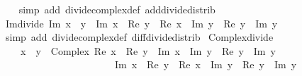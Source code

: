 \begin{isabellebody}
%
\isadelimproof
\ \ %
\endisadelimproof
%
\isatagproof
{}\isamarkupfalse%
\ {\isacharparenleft}{\kern0pt}simp\ add{\isacharcolon}{\kern0pt}\ divide{\isacharunderscore}{\kern0pt}complex{\isacharunderscore}{\kern0pt}def\ add{\isacharunderscore}{\kern0pt}divide{\isacharunderscore}{\kern0pt}distrib{\isacharparenright}{\kern0pt}%
\endisatagproof
{\isafoldproof}%
%
\isadelimproof
\isanewline
%
\endisadelimproof
\isanewline
{}\isamarkupfalse%
\ Im{\isacharunderscore}{\kern0pt}divide{\isacharcolon}{\kern0pt}\ {\isachardoublequoteopen}Im\ {\isacharparenleft}{\kern0pt}x\ {\isacharslash}{\kern0pt}\ y{\isacharparenright}{\kern0pt}\ {\isacharequal}{\kern0pt}\ {\isacharparenleft}{\kern0pt}Im\ x\ {\isacharasterisk}{\kern0pt}\ Re\ y\ {\isacharminus}{\kern0pt}\ Re\ x\ {\isacharasterisk}{\kern0pt}\ Im\ y{\isacharparenright}{\kern0pt}\ {\isacharslash}{\kern0pt}\ {\isacharparenleft}{\kern0pt}{\isacharparenleft}{\kern0pt}Re\ y{\isacharparenright}{\kern0pt}\ {\isacharplus}{\kern0pt}\ {\isacharparenleft}{\kern0pt}Im\ y{\isacharparenright}{\kern0pt}\isanewline
%
\isadelimproof
\ \ %
\endisadelimproof
%
\isatagproof
{}\isamarkupfalse%
\ {\isacharparenleft}{\kern0pt}simp\ add{\isacharcolon}{\kern0pt}\ divide{\isacharunderscore}{\kern0pt}complex{\isacharunderscore}{\kern0pt}def\ diff{\isacharunderscore}{\kern0pt}divide{\isacharunderscore}{\kern0pt}distrib{\isacharparenright}{\kern0pt}%
\endisatagproof
{\isafoldproof}%
%
\isadelimproof
\isanewline
%
\endisadelimproof
\isanewline
{}\isamarkupfalse%
\ Complex{\isacharunderscore}{\kern0pt}divide{\isacharcolon}{\kern0pt}\isanewline
\ \ \ \ {\isachardoublequoteopen}{\isacharparenleft}{\kern0pt}x\ {\isacharslash}{\kern0pt}\ y{\isacharparenright}{\kern0pt}\ {\isacharequal}{\kern0pt}\ Complex\ {\isacharparenleft}{\kern0pt}{\isacharparenleft}{\kern0pt}Re\ x\ {\isacharasterisk}{\kern0pt}\ Re\ y\ {\isacharplus}{\kern0pt}\ Im\ x\ {\isacharasterisk}{\kern0pt}\ Im\ y{\isacharparenright}{\kern0pt}\ {\isacharslash}{\kern0pt}\ {\isacharparenleft}{\kern0pt}{\isacharparenleft}{\kern0pt}Re\ y{\isacharparenright}{\kern0pt}\ {\isacharplus}{\kern0pt}\ {\isacharparenleft}{\kern0pt}Im\ y{\isacharparenright}{\kern0pt}\isanewline
\ \ \ \ \ \ \ \ \ \ \ \ \ \ \ \ \ \ \ \ \ \ \ {\isacharparenleft}{\kern0pt}{\isacharparenleft}{\kern0pt}Im\ x\ {\isacharasterisk}{\kern0pt}\ Re\ y\ {\isacharminus}{\kern0pt}\ Re\ x\ {\isacharasterisk}{\kern0pt}\ Im\ y{\isacharparenright}{\kern0pt}\ {\isacharslash}{\kern0pt}\ {\isacharparenleft}{\kern0pt}{\isacharparenleft}{\kern0pt}Re\ y{\isacharparenright}{\kern0pt}\ {\isacharplus}{\kern0pt}\ {\isacharparenleft}{\kern0pt}Im\ y{\isacharparenright}{\kern0pt}\isanewline

\end{isabellebody}
